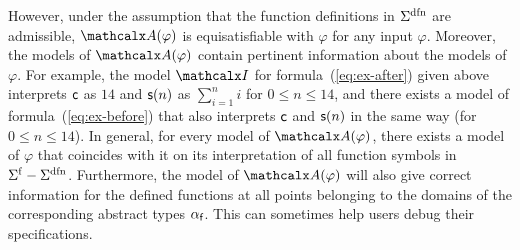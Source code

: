 However, under the assumption that the function definitions in
$\sfundefs{\Sigma}$ are admissible, %
$\conv(\varphi)$ is equisatisfiable with $\varphi$ for any input $\varphi$.
Moreover, the models of $\conv( \varphi )$ contain
pertinent information about the models of $\varphi$. For example, the model
$\I$ for formula~(\ref{eq:ex-after}) given above interprets $\mathsf{c}$ as $14$
and $\mathsf{s}(n)$ as $\sum_{i=1}^n i$ for $0 \le n \le 14$,
and there exists a model of formula~(\ref{eq:ex-before}) that also interprets
$\mathsf{c}$ and $\mathsf{s}(n)$ in the same way (for $0 \le n \le 14$).
In general, for every model of $\conv( \varphi )$,
there exists a model of $\varphi$ that
coincides with it on its interpretation of all
function symbols in $\sfuns{\Sigma} - \sfundefs{\Sigma}$.
Furthermore, the model of $\conv( \varphi )$ will
also give correct information for the defined functions at all points belonging
to the domains of the corresponding abstract types $\alpha_{\mathsf{f}}$.
This can sometimes help users debug their specifications.



